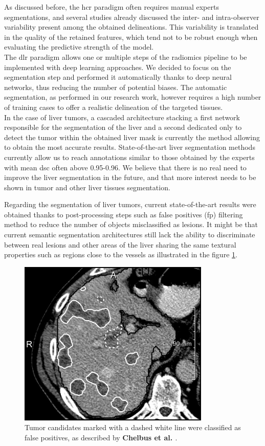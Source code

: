 As discussed before, the \ac{hcr} paradigm often requires manual experts
segmentations, and several studies already discussed the inter- and
intra-observer variability present among the obtained delineations. This
variability is translated in the quality of the retained features, which
tend not to be robust enough when evaluating the predictive 
strength of the model.\\
The \ac{dlr} paradigm allows one or multiple steps of the radiomics pipeline to be implemented with deep learning approaches. We decided to focus on the segmentation step and performed it automatically thanks to deep neural networks, thus reducing the number of potential biases. The automatic segmentation, as
performed in our research work, however requires a high number of
training cases to offer a realistic delineation of the targeted tissues.\\
In the case of liver tumors, a cascaded architecture stacking a first
network responsible for the segmentation of the liver and a second
dedicated only to detect the tumor within the obtained liver mask is
currently the method allowing to obtain the most accurate results.
State-of-the-art liver segmentation methods currently allow us to reach
annotations similar to those obtained by the experts with mean \ac{dsc} often
above 0.95-0.96. We believe that there is no real need to improve the
liver segmentation in the future, and that more interest needs to be
shown in tumor and other liver tissues segmentation.

Regarding the segmentation of liver tumors, current state-of-the-art
results were obtained thanks to post-processing steps such as false
positives (\ac{fp}) filtering method to reduce the number of
objects misclassified as lesions.
It might be that current semantic segmentation architectures still lack the
ability to discriminate between real lesions and other areas of the liver sharing the
same textural properties such as regions close to the vessels as
illustrated in the figure \ref{fig:image5}.



\begin{figure}[th!]
\centering
\includegraphics[width=0.5\linewidth]{../Perspectives/images/chlebus}
\caption{Tumor candidates marked with a dashed white line were classified as false positives, as described by \textbf{Chelbus et al. \cite{Chlebus2018}}.}
\label{fig:image5}
\end{figure}

